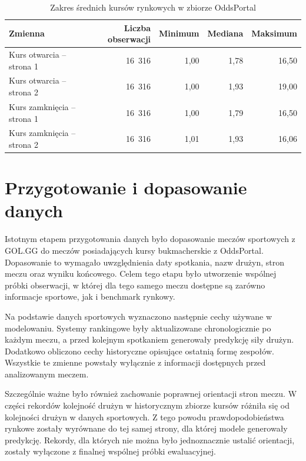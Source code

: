 \begin{table}[H]
    \centering
    \caption{Zakres średnich kursów rynkowych w zbiorze OddsPortal}
    \label{tab:odds_value_ranges}
    \begin{tabular}{lrrrr}
        \toprule
        Zmienna & Liczba obserwacji & Minimum & Mediana & Maksimum \\
        \midrule
        Kurs otwarcia -- strona 1 & 16~316 & 1{,}00 & 1{,}78 & 16{,}50 \\
        Kurs otwarcia -- strona 2 & 16~316 & 1{,}00 & 1{,}93 & 19{,}00 \\
        Kurs zamknięcia -- strona 1 & 16~316 & 1{,}00 & 1{,}79 & 16{,}50 \\
        Kurs zamknięcia -- strona 2 & 16~316 & 1{,}01 & 1{,}93 & 16{,}06 \\
        \bottomrule
    \end{tabular}
\end{table}

\section{Przygotowanie i dopasowanie danych}

Istotnym etapem przygotowania danych było dopasowanie meczów sportowych z GOL.GG do meczów
posiadających kursy bukmacherskie z OddsPortal. Dopasowanie to wymagało uwzględnienia daty
spotkania, nazw drużyn, stron meczu oraz wyniku końcowego. Celem tego etapu było utworzenie wspólnej
próbki obserwacji, w której dla tego samego meczu dostępne są zarówno informacje sportowe, jak i
benchmark rynkowy.

Na podstawie danych sportowych wyznaczono następnie cechy używane w modelowaniu. Systemy rankingowe
były aktualizowane chronologicznie po każdym meczu, a przed kolejnym spotkaniem generowały predykcję
siły drużyn. Dodatkowo obliczono cechy historyczne opisujące ostatnią formę zespołów. Wszystkie te
zmienne powstały wyłącznie z informacji dostępnych przed analizowanym meczem.

Szczególnie ważne było również zachowanie poprawnej orientacji stron meczu. W części rekordów
kolejność drużyn w historycznym zbiorze kursów różniła się od kolejności drużyn w danych sportowych.
Z tego powodu prawdopodobieństwa rynkowe zostały wyrównane do tej samej strony, dla której modele
generowały predykcję. Rekordy, dla których nie można było jednoznacznie ustalić orientacji, zostały
wyłączone z finalnej wspólnej próbki ewaluacyjnej.

